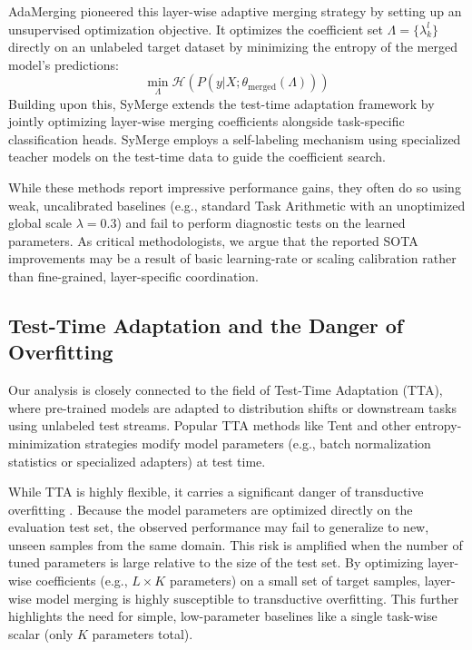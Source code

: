AdaMerging \cite{yang2024adamerging} pioneered this layer-wise adaptive merging strategy by setting up an unsupervised optimization objective. It optimizes the coefficient set $\Lambda = \{\lambda^l_k\}$ directly on an unlabeled target dataset by minimizing the entropy of the merged model's predictions:
\begin{equation}
    \min_{\Lambda} \mathcal{H}(P(y | X; \theta_{\text{merged}}(\Lambda)))
\end{equation}
Building upon this, SyMerge \cite{jung2025symerge} extends the test-time adaptation framework by jointly optimizing layer-wise merging coefficients alongside task-specific classification heads. SyMerge employs a self-labeling mechanism using specialized teacher models on the test-time data to guide the coefficient search. 

While these methods report impressive performance gains, they often do so using weak, uncalibrated baselines (e.g., standard Task Arithmetic with an unoptimized global scale $\lambda=0.3$) and fail to perform diagnostic tests on the learned parameters. As critical methodologists, we argue that the reported SOTA improvements may be a result of basic learning-rate or scaling calibration rather than fine-grained, layer-specific coordination.

\subsection{Test-Time Adaptation and the Danger of Overfitting}
Our analysis is closely connected to the field of Test-Time Adaptation (TTA), where pre-trained models are adapted to distribution shifts or downstream tasks using unlabeled test streams. Popular TTA methods like Tent \cite{wang2021tent} and other entropy-minimization strategies \cite{liang2023comprehensive, goyal2023fly} modify model parameters (e.g., batch normalization statistics or specialized adapters) at test time.

While TTA is highly flexible, it carries a significant danger of transductive overfitting \cite{ash2020deep}. Because the model parameters are optimized directly on the evaluation test set, the observed performance may fail to generalize to new, unseen samples from the same domain. This risk is amplified when the number of tuned parameters is large relative to the size of the test set. By optimizing layer-wise coefficients (e.g., $L \times K$ parameters) on a small set of target samples, layer-wise model merging is highly susceptible to transductive overfitting. This further highlights the need for simple, low-parameter baselines like a single task-wise scalar (only $K$ parameters total).


